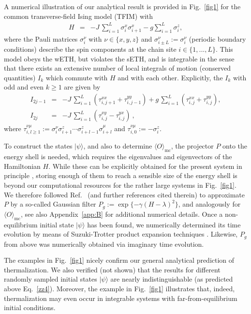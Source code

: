 \documentclass[twocolumn,aps,prb,floatfix,superscriptaddress]{revtex4-2}
\newcommand{\ket}[1]{\lvert #1 \rangle} 	%
\newcommand{\<}{\left\langle}	%
\renewcommand{\>}{\right\rangle}	%
\newcommand{\Ik}{I_{k}}
\newcommand{\Pg}{P_{\! g}}
\newcommand{\Omc}{\langle O\rangle_{\!\mathrm{mc}}}
\begin{document}
A numerical illustration of our analytical result 
is provided in Fig.~\ref{fig1} for the common 
transverse-field Ising model (TFIM) 
\cite{dal16,ess16,vid16} with
\begin{eqnarray}
H & = &  -J\, \sum_{i=1}^L \sigma^x_i \sigma^x_{i+1} - g  \sum_{i=1}^L \sigma^z_i
,
\label{zz6}
\end{eqnarray}
where the Pauli matrices $\sigma_i^{\nu}$ with $\nu\in\{x,y,z\}$
and $\sigma^{\nu}_{i\pm L}:=\sigma^{\nu}_i$ (periodic boundary 
conditions) describe the spin components at the chain site $i\in\{1,...,L\}$.
This model obeys the wETH, but violates the sETH,
and is integrable in the sense that
there exists an extensive number of 
local integrals of motion 
(conserved quantities) $\Ik$ 
which commute with $H$ and with each other.
Explicitly, the $\Ik$ with odd
and even $k\geq 1$ are given by \cite{dal16,ess16}
\begin{eqnarray}
I_{2j-1} & = & 
- J\, \sum_{i=1}^L (\tau^{xx}_{i,j+1}+ \tau^{yy}_{i,j-1}) 
+ g\, \sum_{i=1}^L (\tau^{xx}_{i,j}+ \tau^{yy}_{i,j})
,
\nonumber
\\
I_{2j} & = & - J\, \sum_{i=1}^L (\tau^{xy}_{i,j}- \tau^{yx}_{i,j})
\ ,
\label{i1}
\end{eqnarray}
where $\tau^{\nu\mu}_{i,l\geq 1}:=\sigma_i^\nu\sigma_{i+1}^z \cdots \sigma_{i+l-1}^z\sigma_{i+l}^\mu$
and $\tau^{\nu\mu}_{i,0}:=-\sigma_i^z$.

To construct the states $\ket\psi$,
and also 
to determine $\Omc$,
the projector $P$ onto the energy shell
is needed, which
requires the eigenvalues and eigenvectors
of the Hamiltonian $H$.
While these can be explicitly obtained for the present 
system in principle \cite{vid16},
storing enough of them to reach a sensible size of the energy 
shell is beyond our computational resources
for the rather large 
systems
in Fig.~\ref{fig1}.
We therefore followed Ref.~\cite{filter}
(and further references cited therein)
to approximate $P$ by a so-called Gaussian filter
$\Pg:=\exp\{-\gamma (H-\lambda)^2 \}$, 
and analogously for $\Omc$,
see also Appendix~\ref{app:B}
for additional numerical details.
% 
Once a
non-equilibrium
initial state $|\psi\rangle$
has been found,
we numerically determined
its time evolution by means of Suzuki-Trotter product 
expansion techniques \cite{rae04}.
Likewise, $\Pg $ from above was numerically 
obtained via imaginary time evolution.

The 
examples in Fig.~\ref{fig1} nicely confirm 
our general analytical prediction of thermalization.
We also verified (not shown) that the results for different 
randomly sampled initial states $|\psi\rangle$ 
are nearly indistinguishable
(as predicted above Eq.~\eqref{zz4}).
Moreover, the example in Fig.~\ref{fig1} illustrates that,
indeed, thermalization may even occur in integrable systems 
with far-from-equilibrium initial conditions.
\end{document}

